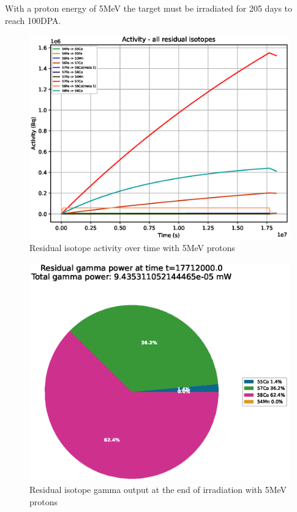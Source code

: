 With a proton energy of 5MeV the target must be irradiated for 205 days to reach 100DPA.

\begin{figure}[!htb]
\centering
\includegraphics[width=0.7\linewidth]{chapters/activity_code/fe_100dpa/by_isotope/05MeV_all_radioactive_isotopes.eps}
\caption{Residual isotope activity over time with 5MeV protons}
\label{fig:5mev-proton-100dpa-activity}
\end{figure}

\begin{figure}[!htb]
\centering
\includegraphics[width=0.7\linewidth]{chapters/activity_code/fe_100dpa/endofbeam/05MeV_0400_17712000.eps}
\caption{Residual isotope gamma output at the end of irradiation with 5MeV protons}
\label{fig:5mev-proton-100dpa}
\end{figure}

